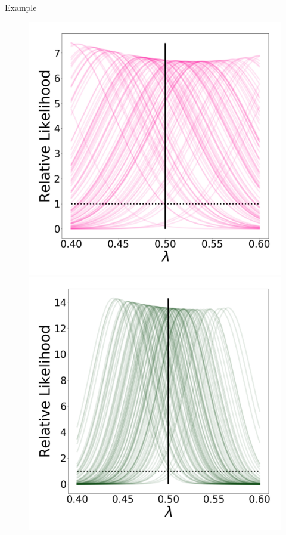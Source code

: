 \begin{block}{Example}

\vspace{1cm}

\vspace{-1cm}
    \begin{figure}
        \includegraphics[width=12cm]{updated_stability_D1_sigma-10E-4}
        \includegraphics[width=12cm]{updated_stability_D10_sigma-10E-4}

\end{figure}
\end{block}
